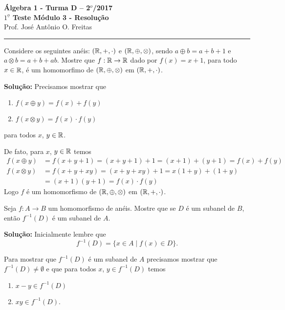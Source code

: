 \documentclass[12pt]{article}
\begin{document}


\begin{center}
{\Large\bf {\'A}lgebra 1 - Turma D -- 2$^{o}$/2017} \\ \vspace{9pt} {\large\bf
  $1^{\underline{o}}$ Teste Módulo 3 - Resolu\c{c}\~ao}\\
\vspace{9pt} Prof. Jos{\'e} Ant{\^o}nio O. Freitas
\end{center}
\hrule

\vspace{.6cm}

\questao Considere os seguintes an{\'e}is: $(\mathbb{R}, +, \cdot)$ e $(\mathbb{R}, \oplus, \otimes)$, sendo $a \oplus b = a + b + 1$ e $a \otimes b = a + b + ab$. Mostre que $f : \mathbb{R} \to \mathbb{R}$ dado por $f(x) = x + 1$, para todo $x \in \mathbb{R}$, {\'e} um homomorfimo de $(\mathbb{R}, \oplus, \otimes)$ em $(\mathbb{R}, +, \cdot)$.

\noindent\textbf{Solu\c{c}\~ao:}
Precisamos mostrar que
\begin{enumerate}[label=({\alph*})]
	\item $f(x \oplus y) = f(x) + f(y)$
	\item $f(x \otimes y) = f(x)\cdot f(y)$
\end{enumerate}
para todos $x$, $y \in \mathbb{R}$.

De fato, para $x$, $y \in \mathbb{R}$ temos
\begin{align*}
	f(x \oplus y) &= f(x + y + 1) = (x + y + 1) + 1 = (x + 1) + (y + 1) = f(x) + f(y)\\
	f(x \otimes y) &=  f(x + y + xy) = (x + y + xy) + 1 = x(1 + y) + (1 + y) \\ &= (x + 1)(y + 1) = f(x)\cdot f(y)
\end{align*}
Logo $f$ é um homomorfismo de $(\mathbb{R}, \oplus, \otimes)$ em $(\mathbb{R}, +, \cdot)$.

\vspace{.5cm}

\questao Seja $f: A \to B$ um homomorfismo de an{\'e}is. Mostre que se $D$ {\'e} um subanel de $B$, ent{\~a}o $f^{-1}(D)$ {\'e} um subanel de $A$.

\noindent\textbf{Solu\c{c}\~ao:} Inicialmente lembre que
\[
	f^{-1}(D) = \{x \in A \mid f(x) \in D\}.
\]

Para mostrar que $f^{-1}(D)$ é um subanel de $A$ precisamos mostrar que $f^{-1}(D) \ne \emptyset$ e que para todos $x$, $y \in f^{-1}(D)$ temos
\begin{enumerate}[label=({\alph*})]
	\item $x - y \in f^{-1}(D)$
	\item $xy \in f^{-1}(D)$.
\end{enumerate}
\end{document}
